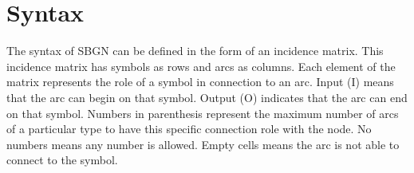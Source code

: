 \section{Syntax}


The syntax of SBGN \ERs can be defined in the form of an incidence matrix. This incidence matrix has symbols as rows and arcs as columns. Each element of the matrix represents the role of a symbol in connection to an arc. Input (I) means that the arc can begin on that symbol. Output (O) indicates that the arc can end on that symbol. Numbers in parenthesis represent the maximum number of arcs of a particular type to have this specific connection role with the node. No numbers means any number is allowed. Empty cells means the arc is not able to connect to the symbol. 

